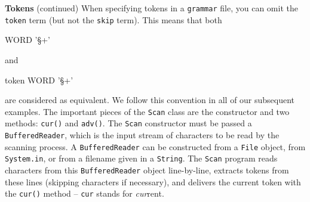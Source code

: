 \begin{minipage}[t]{\sw}
\slidenumber
\LARGE
{\bf Tokens} (continued)\exx
When specifying tokens in a \verb'grammar' file,
you can omit the \verb'token' term (but not the \verb'skip' term).
This means that both
{\Large
\begin{qv}
WORD '\S+'
\end{qv}
}
and
{\Large
\begin{qv}
token WORD '\S+'
\end{qv}
}
are considered as equivalent.
We follow this convention in all of our subsequent examples.\exx
The important pieces of the \verb'Scan' class
are the constructor and two methods: \verb'cur()' and \verb'adv()'.
The \verb'Scan' constructor must be passed
a \verb'BufferedReader',
which is the input stream of characters to be read by the scanning process.
A \verb'BufferedReader' can be constructed from a \verb'File' object,
from \verb'System.in', or from a filename given in a \verb'String'.
The \verb'Scan' program reads characters
from this \verb'BufferedReader' object
line-by-line, extracts tokens from these lines
(skipping characters if necessary),
and delivers the current token with the \verb'cur()' method --
\verb'cur' stands for {\em cur}rent.\exx
\end{minipage}
\clearpage
